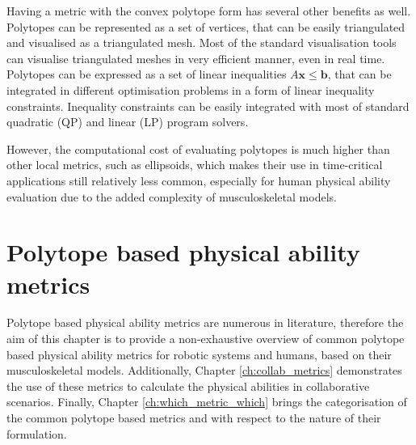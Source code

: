 Having a metric with the convex polytope form has several other benefits as well. Polytopes can be represented as a set of vertices, that can be easily triangulated and visualised as a triangulated mesh. Most of the standard visualisation tools can visualise triangulated meshes in very efficient manner, even in real time.
Polytopes can be expressed as a set of linear inequalities $A\bm{x}\leq\bm{b}$, that can be integrated in different optimisation problems in a form of linear inequality constraints. Inequality constraints can be easily integrated with most of standard quadratic (QP) 
\cite{boggs_tolle_1995} and linear (LP) program \cite{GOLDFARB198973} solvers.


However, the computational cost of evaluating polytopes is much higher than other local metrics, such as ellipsoids, which makes their use in time-critical applications still relatively less common, especially for human physical ability evaluation due to the added complexity of musculoskeletal models. 



\section{Polytope based physical ability metrics}
\label{ch:poly_metrics}
Polytope based physical ability metrics are numerous in literature, therefore the aim of this chapter is to provide a non-exhaustive overview of common polytope based physical ability metrics for robotic systems and humans, based on their musculoskeletal models. Additionally, Chapter \ref{ch:collab_metrics} demonstrates the use of these metrics to calculate the physical abilities in collaborative scenarios. Finally, Chapter \ref{ch:which_metric_which} brings the categorisation of the common polytope based metrics and with respect to the nature of their formulation.

